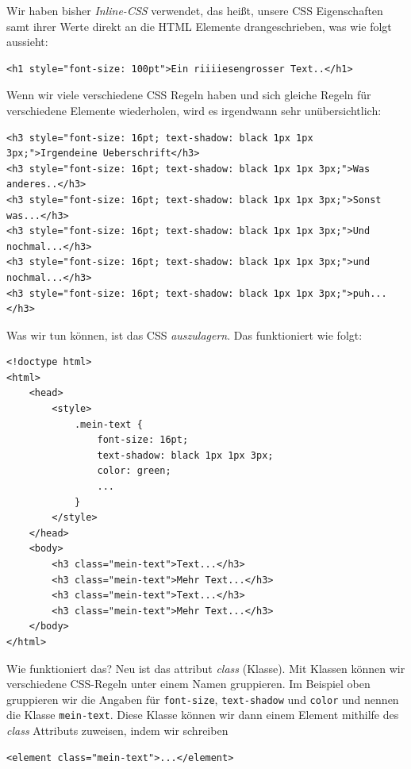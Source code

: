 \documentclass[ngerman,11pt]{article}
\begin{document}
    Wir haben bisher \textit{Inline-CSS} verwendet, das heißt, unsere CSS Eigenschaften samt ihrer Werte direkt an die HTML
    Elemente drangeschrieben, was wie folgt aussieht:

    \begin{lstlisting}[type=htmlcssjs]
<h1 style="font-size: 100pt">Ein riiiiesengrosser Text..</h1>
    \end{lstlisting}

    Wenn wir viele verschiedene CSS Regeln haben und sich gleiche Regeln für verschiedene Elemente
    wiederholen, wird es irgendwann sehr unübersichtlich:

    \begin{lstlisting}[type=htmlcssjs]
<h3 style="font-size: 16pt; text-shadow: black 1px 1px 3px;">Irgendeine Ueberschrift</h3>
<h3 style="font-size: 16pt; text-shadow: black 1px 1px 3px;">Was anderes..</h3>
<h3 style="font-size: 16pt; text-shadow: black 1px 1px 3px;">Sonst was...</h3>
<h3 style="font-size: 16pt; text-shadow: black 1px 1px 3px;">Und nochmal...</h3>
<h3 style="font-size: 16pt; text-shadow: black 1px 1px 3px;">und nochmal...</h3>
<h3 style="font-size: 16pt; text-shadow: black 1px 1px 3px;">puh...</h3>
    \end{lstlisting}

    Was wir tun können, ist das CSS \textit{auszulagern}.
    Das funktioniert wie folgt:

    \begin{lstlisting}[type=htmlcssjs]
<!doctype html>
<html>
    <head>
        <style>
            .mein-text {
                font-size: 16pt;
                text-shadow: black 1px 1px 3px;
                color: green;
                ...
            }
        </style>
    </head>
    <body>
        <h3 class="mein-text">Text...</h3>
        <h3 class="mein-text">Mehr Text...</h3>
        <h3 class="mein-text">Text...</h3>
        <h3 class="mein-text">Mehr Text...</h3>
    </body>
</html>
    \end{lstlisting}

    Wie funktioniert das?
    Neu ist das attribut \textit{class} (Klasse).
    Mit Klassen können wir verschiedene CSS-Regeln unter einem Namen gruppieren.
    Im Beispiel oben gruppieren wir die Angaben für \lstinline{font-size}, \lstinline{text-shadow} und \lstinline{color}
    und nennen die Klasse \lstinline{mein-text}.
    Diese Klasse können wir dann einem Element mithilfe des \textit{class} Attributs zuweisen, indem wir schreiben

    \begin{lstlisting}[type=htmlcssjs]
<element class="mein-text">...</element>
    \end{lstlisting}
\end{document}
